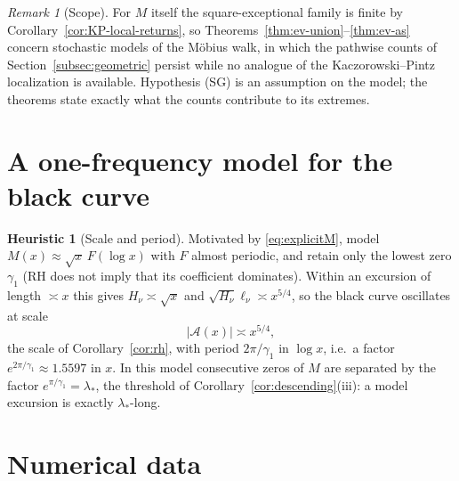 \documentclass[11pt]{amsart}
\numberwithin{equation}{section}
\theoremstyle{plain}
\theoremstyle{definition}
\newtheorem{heuristic}[theorem]{Heuristic}
\theoremstyle{remark}
\newtheorem{remark}[theorem]{Remark}
\newcommand{\Anet}{\mathcal{A}}
\begin{document}
\begin{remark}[Scope]
\label{rem:ev-scope}
For $M$ itself the square-exceptional family is finite by
Corollary~\ref{cor:KP-local-returns}, so
Theorems~\ref{thm:ev-union}--\ref{thm:ev-as} concern stochastic models of
the M\"obius walk, in which the pathwise counts of
Section~\ref{subsec:geometric} persist while no analogue of the
Kaczorowski--Pintz localization is available. Hypothesis (SG) is an
assumption on the model; the theorems state exactly what the counts
contribute to its extremes.
\end{remark}


\section{A one-frequency model for the black curve}
\label{sec:model}

\begin{heuristic}[Scale and period]
\label{heu:model}
Motivated by \eqref{eq:explicitM}, model $M(x)\approx\sqrt x\,F(\log x)$
with $F$ almost periodic, and retain only the lowest zero $\gamma_1$ (RH
does not imply that its coefficient dominates). Within an excursion of
length $\asymp x$ this gives $H_\nu\asymp\sqrt x$ and
$\sqrt{H_\nu}\ell_\nu\asymp x^{5/4}$, so the black curve oscillates at scale
\begin{equation}
\label{eq:model_scale}
  |\Anet(x)|\asymp x^{5/4},
\end{equation}
the scale of Corollary~\ref{cor:rh}, with period $2\pi/\gamma_1$ in
$\log x$, i.e.\ a factor $e^{2\pi/\gamma_1}\approx1.5597$ in $x$. In this
model consecutive zeros of $M$ are separated by the factor
$e^{\pi/\gamma_1}=\lambda_*$, the threshold of
Corollary~\ref{cor:descending}(iii): a model excursion is exactly
$\lambda_*$-long.
\end{heuristic}


\section{Numerical data}
\label{sec:data}
\end{document}
